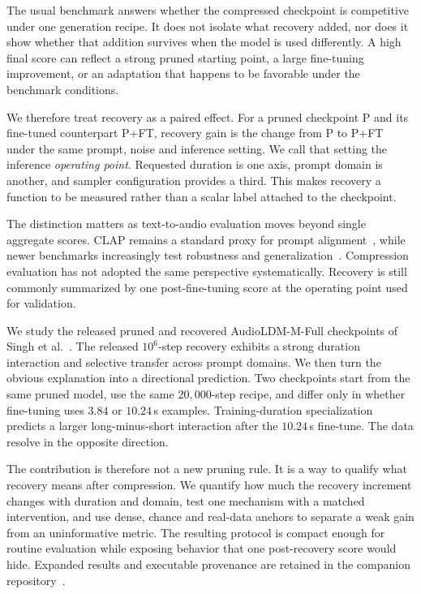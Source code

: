 \documentclass{article}
\newcommand{\PFT}{P{+}FT}
\begin{document}
The usual benchmark answers whether the compressed checkpoint is competitive under one generation recipe. It does not isolate what recovery added, nor does it show whether that addition survives when the model is used differently. A high final score can reflect a strong pruned starting point, a large fine-tuning improvement, or an adaptation that happens to be favorable under the benchmark conditions.

We therefore treat recovery as a paired effect. For a pruned checkpoint P and its fine-tuned counterpart \PFT{}, recovery gain is the change from P to \PFT{} under the same prompt, noise and inference setting. We call that setting the inference \emph{operating point}. Requested duration is one axis, prompt domain is another, and sampler configuration provides a third. This makes recovery a function to be measured rather than a scalar label attached to the checkpoint.

The distinction matters as text-to-audio evaluation moves beyond single aggregate scores. CLAP remains a standard proxy for prompt alignment~\cite{wu2023clap,huang2023makeanaudio,ghosal2023tango}, while newer benchmarks increasingly test robustness and generalization~\cite{wang2026ttabench}. Compression evaluation has not adopted the same perspective systematically. Recovery is still commonly summarized by one post-fine-tuning score at the operating point used for validation.

We study the released pruned and recovered AudioLDM-M-Full checkpoints of Singh et al.~\cite{singh2026pruning}. The released $10^{6}$-step recovery exhibits a strong duration interaction and selective transfer across prompt domains. We then turn the obvious explanation into a directional prediction. Two checkpoints start from the same pruned model, use the same $20{,}000$-step recipe, and differ only in whether fine-tuning uses $3.84$ or $10.24$\,s examples. Training-duration specialization predicts a larger long-minus-short interaction after the $10.24$\,s fine-tune. The data resolve in the opposite direction.

The contribution is therefore not a new pruning rule. It is a way to qualify what recovery means after compression. We quantify how much the recovery increment changes with duration and domain, test one mechanism with a matched intervention, and use dense, chance and real-data anchors to separate a weak gain from an uninformative metric. The resulting protocol is compact enough for routine evaluation while exposing behavior that one post-recovery score would hide. Expanded results and executable provenance are retained in the companion repository~\cite{bibbo2026repo}.
\end{document}
